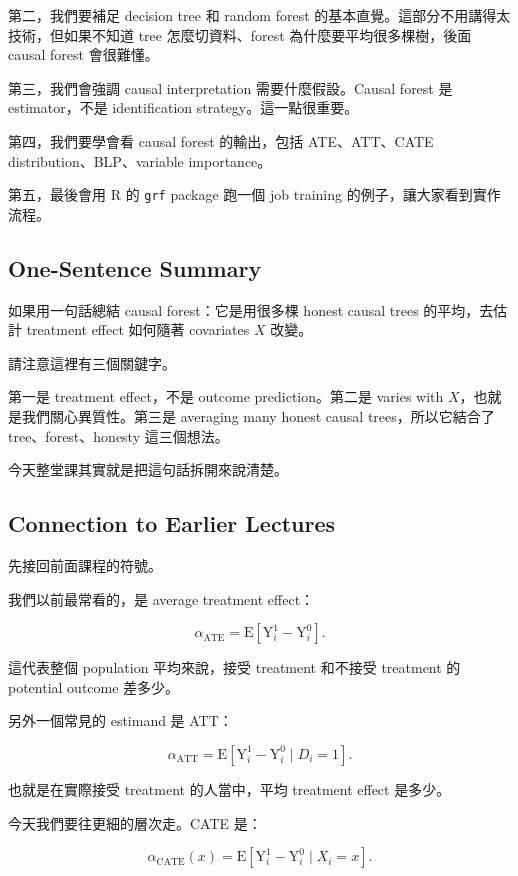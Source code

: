 \documentclass[
  chinese,
  11pt,
]{article}
\begin{document}
第二，我們要補足 decision tree 和 random forest
的基本直覺。這部分不用講得太技術，但如果不知道 tree 怎麼切資料、forest
為什麼要平均很多棵樹，後面 causal forest 會很難懂。

第三，我們會強調 causal interpretation 需要什麼假設。Causal forest 是
estimator，不是 identification strategy。這一點很重要。

第四，我們要學會看 causal forest 的輸出，包括 ATE、ATT、CATE
distribution、BLP、variable importance。

第五，最後會用 R 的 \texttt{grf} package 跑一個 job training
的例子，讓大家看到實作流程。

\subsection{One-Sentence Summary}\label{one-sentence-summary}

如果用一句話總結 causal forest：它是用很多棵 honest causal trees
的平均，去估計 treatment effect 如何隨著 covariates \(X\) 改變。

請注意這裡有三個關鍵字。

第一是 treatment effect，不是 outcome prediction。第二是 varies with
\(X\)，也就是我們關心異質性。第三是 averaging many honest causal
trees，所以它結合了 tree、forest、honesty 這三個想法。

今天整堂課其實就是把這句話拆開來說清楚。

\subsection{Connection to Earlier
Lectures}\label{connection-to-earlier-lectures}

先接回前面課程的符號。

我們以前最常看的，是 average treatment effect：

\[
\alpha_{\text{ATE}} =
\mathrm{E}\left[\mathrm{Y}^{1}_{i}-\mathrm{Y}^{0}_{i}\right].
\]

這代表整個 population 平均來說，接受 treatment 和不接受 treatment 的
potential outcome 差多少。

另外一個常見的 estimand 是 ATT：

\[
\alpha_{\text{ATT}} =
\mathrm{E}\left[\mathrm{Y}^{1}_{i}-\mathrm{Y}^{0}_{i}\mid D_i=1\right].
\]

也就是在實際接受 treatment 的人當中，平均 treatment effect 是多少。

今天我們要往更細的層次走。CATE 是：

\[
\alpha_{\text{CATE}}(x) =
\mathrm{E}\left[\mathrm{Y}^{1}_{i}-\mathrm{Y}^{0}_{i}\mid X_i=x\right].
\]
\end{document}

